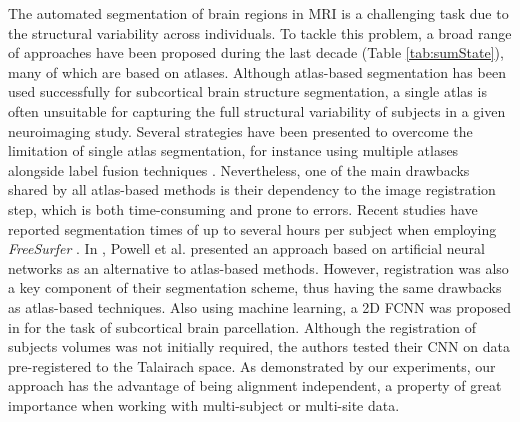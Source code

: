 \documentclass[twoside,fleqn,espcrc2]{elsarticle}
\newcommand{\FreeSurfer}{\textit{FreeSurfer}}
\begin{document}
The automated segmentation of brain regions in MRI is a challenging task due to the structural variability across individuals. To tackle this problem, a broad range of approaches have been proposed during the last decade (Table \ref{tab:sumState}), many of which are based on atlases. Although atlas-based segmentation has been used successfully for subcortical brain structure segmentation, a single atlas is often unsuitable for capturing the full structural variability of subjects in a given neuroimaging study. Several strategies have been presented to overcome the limitation of single atlas segmentation, for instance using multiple atlases alongside label fusion techniques \cite{khan2011optimal}. Nevertheless, one of the main drawbacks shared by all atlas-based methods is their dependency to the image registration step, which is both time-consuming and prone to errors. Recent studies have reported segmentation times of up to several hours per subject when employing \FreeSurfer{} \cite{khan2008freesurfer,huo2016consistent}. In \cite{powell2008registration}, Powell et al. presented an approach based on artificial neural networks as an alternative to atlas-based methods. However, registration was also a key component of their segmentation scheme, thus having the same drawbacks as atlas-based techniques. Also using machine learning, a 2D FCNN was proposed in \cite{shakeri2016sub} for the task of subcortical brain parcellation. Although the registration of subjects volumes was not initially required, the authors tested their CNN on data pre-registered to the Talairach space. As demonstrated by our experiments, our approach has the advantage of being alignment independent, a property of great importance when working with multi-subject or multi-site data.
\end{document}
